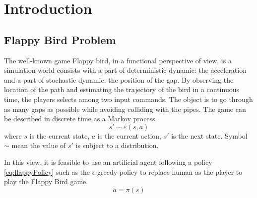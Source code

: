 \documentclass[conference,compsoc]{IEEEtran}
\begin{document}
\section{Introduction}



\subsection{Flappy Bird Problem}
The well-known game Flappy bird, in a functional perspective of view, is a simulation world consists with a part of deterministic dynamic: the acceleration and a part of stochastic dynamic: the position of the gap. By observing the location of the path and estimating the trajectory of the bird in a continuous time, the players selects among two input commands. The object is to go through as many gaps as possible while avoiding colliding with the pipes.  The game can be described in discrete time as a Markov process. 
\begin{equation}
s' \sim \varepsilon (s,a)
\end{equation}
where $s$ is the current state, $a$ is the current action, $s'$ is the next state. Symbol $\sim$ mean the value of $s'$ is subject to a distribution. 

In this view, it is feasible to use an artificial agent following a policy \eqref{eq:flappyPolicy} such as the $\epsilon$-greedy policy to replace human as the player to play the Flappy Bird game. \cite{sutton1998reinforcement} 
\begin{equation}\label{eq:flappyPolicy}
a=\pi(s)
\end{equation}
\end{document}
